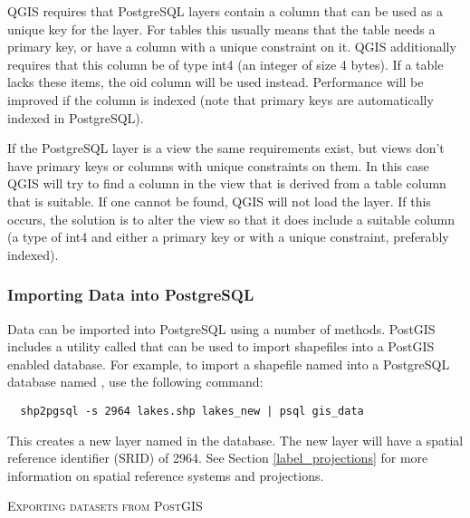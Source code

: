QGIS requires that PostgreSQL layers contain a column that can be
used as a unique key for the layer. For tables this usually means
that the table needs a primary key, or have a column with a unique
constraint on it. QGIS additionally requires that this column be of
type int4 (an integer of size 4 bytes). If a table lacks these items,
the oid column will be used instead. Performance will be improved if the
column is indexed (note that primary keys are automatically indexed in
PostgreSQL). 

If the PostgreSQL layer is a view the same requirements exist, but
views don't have primary keys or columns with unique constraints on
them. In this case QGIS will try to find a column in the view that is
derived from a table column that is suitable. If one cannot be found,
QGIS will not load the layer. If this occurs, the solution is to alter
the view so that it does include a suitable column (a type of int4
and either a primary key or with a unique constraint, preferably indexed).

\subsubsection{Importing Data into PostgreSQL}\label{sec:loading_postgis_data}

Data can be imported into PostgreSQL using a number of methods. PostGIS
includes a utility called  that can be used to import shapefiles into
a PostGIS enabled database. For example, to import a shapefile named
into a PostgreSQL database named , use the following command:

\begin{verbatim} 
  shp2pgsql -s 2964 lakes.shp lakes_new | psql gis_data
\end{verbatim}

This creates a new layer named  in the
 database. The
new layer will have a spatial reference identifier (SRID) of 2964. See Section 
\ref{label_projections} for more information on spatial reference systems and
projections.
\begin{Tip}
\caption{\textsc{Exporting datasets from PostGIS}}
\end{Tip}

